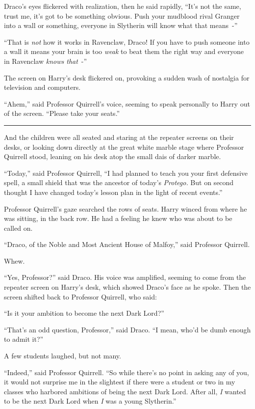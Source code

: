 Draco's eyes flickered with realization, then he said rapidly, ``It's not the same, trust me, it's got to be something obvious. Push your mudblood rival Granger into a wall or something, everyone in Slytherin will know what that means~-''

``That is \emph{not} how it works in Ravenclaw, Draco! If you have to push someone into a wall it means your brain is too \emph{weak} to beat them the right way and everyone in Ravenclaw \emph{knows that}~-''

The screen on Harry's desk flickered on, provoking a sudden wash of nostalgia for television and computers.

``Ahem,'' said Professor Quirrell's voice, seeming to speak personally to Harry out of the screen. ``Please take your seats.''

\begin{center}\rule{3in}{0.4pt}\end{center}

And the children were all seated and staring at the repeater screens on their desks, or looking down directly at the great white marble stage where Professor Quirrell stood, leaning on his desk atop the small dais of darker marble.

``Today,'' said Professor Quirrell, ``I had planned to teach you your first defensive spell, a small shield that was the ancestor of today's \emph{Protego.} But on second thought I have changed today's lesson plan in the light of recent events.''

Professor Quirrell's gaze searched the rows of seats. Harry winced from where he was sitting, in the back row. He had a feeling he knew who was about to be called on.

``Draco, of the Noble and Most Ancient House of Malfoy,'' said Professor Quirrell.

Whew.

``Yes, Professor?'' said Draco. His voice was amplified, seeming to come from the repeater screen on Harry's desk, which showed Draco's face as he spoke. Then the screen shifted back to Professor Quirrell, who said:

``Is it your ambition to become the next Dark Lord?''

``That's an odd question, Professor,'' said Draco. ``I mean, who'd be dumb enough to admit it?''

A few students laughed, but not many.

``Indeed,'' said Professor Quirrell. ``So while there's no point in asking any of you, it would not surprise me in the slightest if there were a student or two in my classes who harbored ambitions of being the next Dark Lord. After all, \emph{I} wanted to be the next Dark Lord when \emph{I} was a young Slytherin.''

